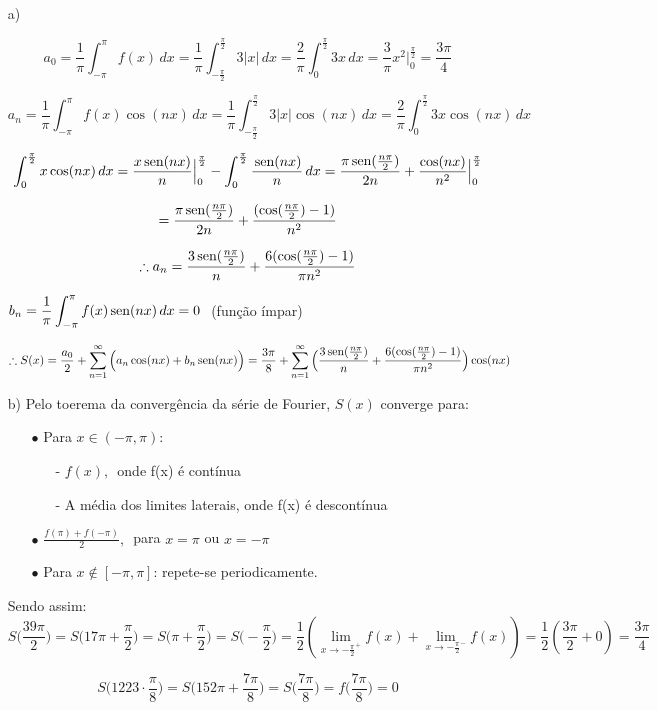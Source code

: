 \documentclass[12pt,a4paper]{article}
\newcommand{\sen}{\mbox{\,sen}}
\begin{document}
\begin{itemize}
\item[a)]

$$ a_0 = \frac{1}{\pi} \int_{-\pi}^\pi f(x) \, dx = \frac{1}{\pi} \int_{-\frac{\pi}{2}}^{\frac{\pi}{2}} 3 |x| \, dx = \frac{2}{\pi} \int_{0}^{\frac{\pi}{2}} 3 x \, dx = \frac{3}{\pi} x^2 \Big|_0^{\frac{\pi}{2}} = \frac{3\pi}{4} $$

$$ a_n = \frac{1}{\pi} \int_{-\pi}^\pi f(x) \cos (n x) \, dx = \frac{1}{\pi} \int_{-\frac{\pi}{2}}^{\frac{\pi}{2}} 3 |x| \cos (n x) \, dx = \frac{2}{\pi} \int_{0}^{\frac{\pi}{2}} 3 x \cos (n x) \, dx $$

$$ \int_{0}^{\frac{\pi}{2}}  x \cos (n x) \, dx =  \frac{x \sen (nx)}{n} \Big|_0^\frac{\pi}{2} -  \int_{0}^{\frac{\pi}{2}} \frac{\sen(nx)}{n} \,dx = \frac{\pi \sen( \frac{n \pi}{2})}{2 n} + \frac{\cos (nx)}{n^2} \Big|_0^\frac{\pi}{2}    $$

$$ = \frac{\pi \sen( \frac{n \pi}{2})}{2 n} + \frac{ ( \cos (\frac{n \pi}{2}) -1)}{n^2} $$

$$ \therefore a_n =  \frac{ 3 \sen( \frac{n \pi}{2})}{ n} +  \frac{ 6 ( \cos (\frac{n \pi}{2}) -1)}{\pi n^2} $$

\begin{center}
$b_n = \displaystyle\frac{1}{\pi} \displaystyle\int_{-\pi}^\pi f(x) \sen (n x) \, dx = 0 \,\,$ (função ímpar)
\end{center}

$$ \therefore S(x) = \frac{a_0}{2} + \sum_{n=1}^\infty \Big( a_n \cos(nx) + b_n \sen(nx) \Big) = \frac{3\pi}{8} + \sum_{n=1}^\infty \Big( \frac{ 3 \sen( \frac{n \pi}{2})}{ n} +  \frac{ 6 ( \cos (\frac{n \pi}{2}) -1)}{\pi n^2} \Big) \cos (nx) $$

\item[b)] Pelo toerema da convergência da série de Fourier, $S(x)$ converge para:

\begin{itemize}
\item[$\bullet$] Para $x \in  (-\pi,\pi)$:
	\begin{itemize}
	\item[-] $f(x), \,$ onde f(x) é contínua
	\item[-] A média dos limites laterais, onde f(x) é descontínua
	\end{itemize}
\item[$\bullet$] $\displaystyle\frac{f(\pi)+f(-\pi)}{2}, \, $ para $ x = \pi $ ou $ x = -\pi $ 
\item[$\bullet$] Para $x \notin [ -\pi,\pi]$: repete-se periodicamente.
\end{itemize}

Sendo assim:
$$ S\Big(\frac{39 \pi}{2}\Big) = S\Big(17\pi + \frac{\pi}{2}\Big) = S\Big(\pi + \frac{\pi}{2}\Big) = S\Big(- \frac{\pi}{2}\Big) = \frac{1}{2} ( \lim_{x \rightarrow - \frac{\pi}{2}^+ } f(x) + \lim_{x \rightarrow - \frac{\pi}{2}^- } f(x) ) = \frac{1}{2} ( \frac{3\pi}{2} + 0) = \frac{3\pi}{4} $$

$$ S\Big(1223 \cdot \frac{\pi}{8}\Big) = S\Big(152\pi + \frac{7 \pi}{8}\Big) = S\Big(\frac{7\pi}{8}\Big) = f\Big(\frac{7\pi}{8}\Big) = 0 $$

\end{itemize}
\end{document}
